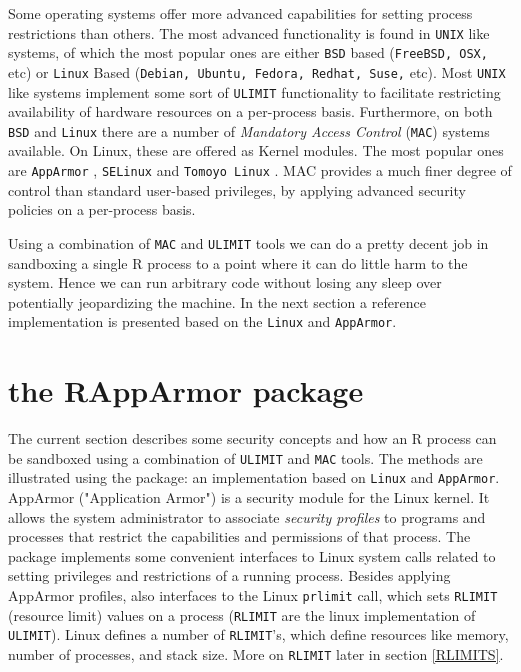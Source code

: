 \documentclass[article]{jss}
\begin{document}
Some operating systems offer more advanced capabilities for setting process
restrictions than others. The most advanced functionality is found in
\texttt{UNIX} like systems, of which the most popular ones are either
\texttt{BSD} based (\texttt{FreeBSD, OSX,} etc) or \texttt{Linux} Based
(\texttt{Debian, Ubuntu, Fedora, Redhat, Suse,} etc). Most \texttt{UNIX} like
systems implement some sort of \texttt{ULIMIT} functionality to facilitate
restricting availability of hardware resources on a per-process basis.
Furthermore, on both \texttt{BSD} and \texttt{Linux} there are a number of
\emph{Mandatory Access Control} (\texttt{MAC}) systems available. On Linux,
these are offered as Kernel modules. The most popular ones are \texttt{AppArmor}
\citep{apparmor}, \texttt{SELinux} \citep{selinux} and \texttt{Tomoyo Linux}
\citep{tomoyo}. MAC provides a much finer degree of control than standard
user-based privileges, by applying advanced security policies on a per-process
basis.

Using a combination of \texttt{MAC} and \texttt{ULIMIT} tools we can do a pretty
decent job in sandboxing a single R process to a point where it can do little
harm to the system. Hence we can run arbitrary  code without losing
any sleep over potentially jeopardizing the machine. In the next section a
reference implementation is presented based on the \texttt{Linux} and
\texttt{AppArmor}.

\section{the RAppArmor package}

The current section describes some security concepts and how an R process can be
sandboxed using a combination of \texttt{ULIMIT} and \texttt{MAC} tools. The methods
are illustrated using the  package: an implementation based on
\texttt{Linux} and \texttt{AppArmor}. AppArmor ("Application Armor") is a
security module for the Linux kernel. It allows the system administrator to
associate \emph{security profiles} to programs and processes that restrict the
capabilities and permissions of that process. The  
package implements some convenient  interfaces to Linux system
calls related to setting privileges and restrictions of a running process.
Besides applying AppArmor profiles,  also interfaces to
the Linux \texttt{prlimit} call, which sets \texttt{RLIMIT} (resource limit) values on a
process (\texttt{RLIMIT} are the linux implementation of \texttt{ULIMIT}).
Linux defines a number of \texttt{RLIMIT}'s, which define resources like
memory, number of processes, and stack size. More on \texttt{RLIMIT} later in
section \ref{RLIMITS}.
\end{document}
